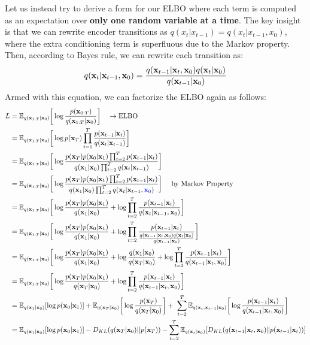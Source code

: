 Let us instead try to derive a form for our ELBO where each term is computed as an expectation over \textbf{only one random variable at a time}. The key insight is that we can rewrite encoder transitions as $q(x_t|x_{t-1}) = q(x_t|x_{t-1}, x_0)$, where the extra conditioning term is superfluous due to the Markov property. Then, according to Bayes rule, we can rewrite each transition as:
\begin{align*}
	q({\mathbf{x}}_t|{\mathbf{x}}_{t-1}, {\mathbf{x}}_0)= \frac{q({\mathbf{x}}_{t-1}|{\mathbf{x}}_t, {\mathbf{x}}_0)q({\mathbf{x}}_t| {\mathbf{x}}_0)}{q({\mathbf{x}}_{t-1}| {\mathbf{x}}_0)} 
\end{align*}
Armed with this equation, we can factorize the ELBO again as follows:
\begin{align}
	L 
	&= \mathbb{E}_{q({\mathbf{x}}_{1:T}|{\mathbf{x}}_0)}\bigg[\log\frac{p({\mathbf{x}}_{0:T})}{q({\mathbf{x}}_{1:T}|{\mathbf{x}}_0)}\bigg] \quad \to \textrm{ELBO}\\		
	&= \mathbb{E}_{q({\mathbf{x}}_{1:T}|{\mathbf{x}}_0)}\bigg[\log p({\mathbf{x}}_T)\prod_{t=1}^T\frac{p({\mathbf{x}}_{t-1}|{\mathbf{x}}_t)}{q({\mathbf{x}}_{t}|{\mathbf{x}}_{t-1})}\bigg]\\
	&= \mathbb{E}_{q({\mathbf{x}}_{1:T}|{\mathbf{x}}_0)}\bigg[\log \frac{p({\mathbf{x}}_T)p({\mathbf{x}}_0|{\mathbf{x}}_{1})\prod_{t=2}^{T} p({\mathbf{x}}_{t-1}|{\mathbf{x}}_{t})}{q({\mathbf{x}}_1|{\mathbf{x}}_{0})\prod_{t=2}^{T}  q({\mathbf{x}}_{t}|{\mathbf{x}}_{t-1})}\bigg]\\
	&= \mathbb{E}_{q({\mathbf{x}}_{1:T}|{\mathbf{x}}_0)}\bigg[\log \frac{p({\mathbf{x}}_T)p({\mathbf{x}}_0|{\mathbf{x}}_{1})\prod_{t=2}^{T} p({\mathbf{x}}_{t-1}|{\mathbf{x}}_{t})}{q({\mathbf{x}}_1|{\mathbf{x}}_{0})\prod_{t=2}^{T}  q({\mathbf{x}}_{t}|{\mathbf{x}}_{t-1}, \textcolor{blue}{{\mathbf{x}}_0})}\bigg] \quad \textrm{ by Markov Property}\\
	&= \mathbb{E}_{q({\mathbf{x}}_{1:T}|{\mathbf{x}}_0)}\bigg[\log \frac{p({\mathbf{x}}_T)p({\mathbf{x}}_0|{\mathbf{x}}_{1})}{q({\mathbf{x}}_1|{\mathbf{x}}_{0})}+\log \prod_{t=2}^{T}\frac{ p({\mathbf{x}}_{t-1}|{\mathbf{x}}_{t})}{q({\mathbf{x}}_{t}|{\mathbf{x}}_{t-1}, {\mathbf{x}}_0)}\bigg]\\
	&= \mathbb{E}_{q({\mathbf{x}}_{1:T}|{\mathbf{x}}_0)}\bigg[\log \frac{p({\mathbf{x}}_T)p({\mathbf{x}}_0|{\mathbf{x}}_{1})}{q({\mathbf{x}}_1|{\mathbf{x}}_{0})}+\log \prod_{t=2}^{T}\frac{ p({\mathbf{x}}_{t-1}|{\mathbf{x}}_{t})}{\frac{q({\mathbf{x}}_{t-1}|{\mathbf{x}}_t, {\mathbf{x}}_0)q({\mathbf{x}}_t| {\mathbf{x}}_0)}{q({\mathbf{x}}_{t-1}| {\mathbf{x}}_0)}}\bigg]\\
	&= \mathbb{E}_{q({\mathbf{x}}_{1:T}|{\mathbf{x}}_0)}\bigg[\log \frac{p({\mathbf{x}}_T)p({\mathbf{x}}_0|{\mathbf{x}}_{1})}{q({\mathbf{x}}_1|{\mathbf{x}}_{0})}+\log \frac{q({\mathbf{x}}_1|{\mathbf{x}}_0)}{q({\mathbf{x}}_T|{\mathbf{x}}_0)}+\log \prod_{t=2}^{T}\frac{ p({\mathbf{x}}_{t-1}|{\mathbf{x}}_{t})}{q({\mathbf{x}}_{t-1}|{\mathbf{x}}_t, {\mathbf{x}}_0)}\bigg]\\
	&= \mathbb{E}_{q({\mathbf{x}}_{1:T}|{\mathbf{x}}_0)}\bigg[\log \frac{p({\mathbf{x}}_T)p({\mathbf{x}}_0|{\mathbf{x}}_{1})}{q({\mathbf{x}}_T|{\mathbf{x}}_{0})}+\log \prod_{t=2}^{T}\frac{ p({\mathbf{x}}_{t-1}|{\mathbf{x}}_{t})}{q({\mathbf{x}}_{t-1}|{\mathbf{x}}_t, {\mathbf{x}}_0)}\bigg]\\
	&= \mathbb{E}_{q({\mathbf{x}}_{1}|{\mathbf{x}}_0)}[\log p({\mathbf{x}}_0|{\mathbf{x}}_{1})]+\mathbb{E}_{q({\mathbf{x}}_{T}|{\mathbf{x}}_0)}\bigg[\log \frac{p({\mathbf{x}}_T)}{q({\mathbf{x}}_T|{\mathbf{x}}_{0})}\bigg]+\ \sum_{t=2}^{T}\mathbb{E}_{q({\mathbf{x}}_{t},{\mathbf{x}}_{t-1}|{\mathbf{x}}_0)}\bigg[\log\frac{ p({\mathbf{x}}_{t-1}|{\mathbf{x}}_{t})}{q({\mathbf{x}}_{t-1}|{\mathbf{x}}_t, {\mathbf{x}}_0)}\bigg]\\
	&= \mathbb{E}_{q({\mathbf{x}}_{1}|{\mathbf{x}}_0)}[\log p({\mathbf{x}}_0|{\mathbf{x}}_{1})]-D_{KL}(q({\mathbf{x}}_{T}|{\mathbf{x}}_0)||p({\mathbf{x}}_T))-\sum_{t=2}^{T}\mathbb{E}_{q({\mathbf{x}}_{t}|{\mathbf{x}}_0)}[D_{KL}(q({\mathbf{x}}_{t-1}|{\mathbf{x}}_t, {\mathbf{x}}_0)\|p({\mathbf{x}}_{t-1}|{\mathbf{x}}_{t}))]
\end{align}
